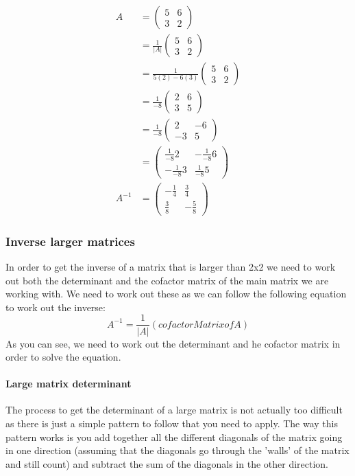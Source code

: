 \documentclass{article}
\begin{document}
\begin{align*}
	A  &=
	\begin{pmatrix}
		5 & 6\\
		3 & 2
	\end{pmatrix}
	\\
	&= \frac{1}{|A|}
	\begin{pmatrix}
		5 & 6\\
		3 & 2
	\end{pmatrix}
	\\
	&= \frac{1}{5(2) - 6(3)}
	\begin{pmatrix}
		5 & 6\\
		3 & 2
	\end{pmatrix}
	\\
	&= \frac{1}{-8}
	\begin{pmatrix}
		2 & 6\\
		3 & 5
	\end{pmatrix}
	\\
	&= \frac{1}{-8}
	\begin{pmatrix}
		2 & -6\\
		-3 & 5
	\end{pmatrix}
	\\
	&=
	\begin{pmatrix}
		\frac{1}{-8}2 & -\frac{1}{-8}6\\
		-\frac{1}{-8}3 & \frac{1}{-8}5
	\end{pmatrix}
	\\
	A^{-1}&=
	\begin{pmatrix}
		-\frac{1}{4} & \frac{3}{4}\\
		\frac{3}{8} & -\frac{5}{8}
	\end{pmatrix}
\end{align*}
\subsubsection{Inverse larger matrices}
In order to get the inverse of a matrix that is larger than 2x2 we need to work out both the determinant and the cofactor matrix of the main matrix we are working with. We need to work out these as we can follow the following equation to work out the inverse:
\[
	A^{-1} = \frac{1}{|A|}(cofactor Matrix of A)
\]
As you can see, we need to work out the determinant and he cofactor matrix in order to solve the equation.
\paragraph{Large matrix determinant}
The process to get the determinant of a large matrix is not actually too difficult as there is just a simple pattern to follow that you need to apply. The way this pattern works is you add together all the different diagonals of the matrix going in one direction (assuming that the diagonals go through the 'walls' of the matrix and still count) and subtract the sum of the diagonals in the other direction. 
\end{document}
